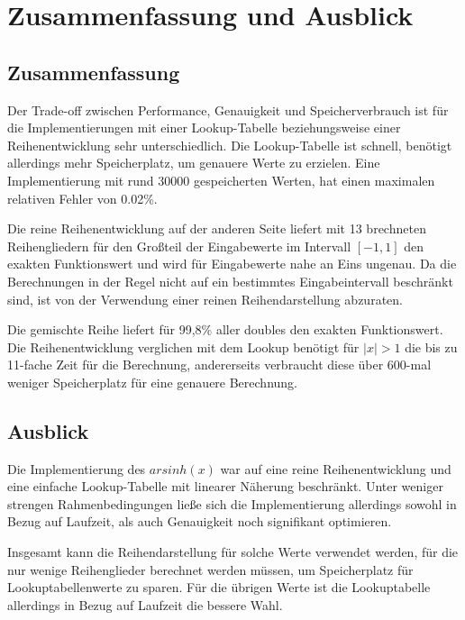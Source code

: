 \documentclass[course=erap] {aspdoc}
\begin{document}
    \section{Zusammenfassung und Ausblick}\label{sec:zusammenfassung-und-ausblick}

    \subsection{Zusammenfassung}\label{subsec:zusammenfassung}

    Der Trade-off zwischen Performance, Genauigkeit und Speicherverbrauch ist für die Implementierungen mit einer Lookup-Tabelle beziehungsweise einer Reihenentwicklung sehr unterschiedlich.
    Die Lookup-Tabelle ist schnell, benötigt allerdings mehr Speicherplatz, um genauere Werte zu erzielen.
    Eine Implementierung mit rund 30000 gespeicherten Werten, hat einen maximalen relativen Fehler von 0.02\%.

    Die reine Reihenentwicklung auf der anderen Seite liefert mit 13 brechneten Reihengliedern für den Großteil der Eingabewerte im Intervall $[-1, 1]$ den exakten Funktionswert und wird für Eingabewerte nahe an Eins ungenau.
    Da die Berechnungen in der Regel nicht auf ein bestimmtes Eingabeintervall beschränkt sind, ist von der Verwendung einer reinen Reihendarstellung abzuraten.
    

    Die gemischte Reihe liefert für 99,8\% aller doubles den exakten Funktionswert.
    Die Reihenentwicklung verglichen mit dem Lookup benötigt für $|x|>1$ die bis zu 11-fache Zeit für die Berechnung, andererseits verbraucht diese über 600-mal weniger Speicherplatz für eine genauere Berechnung.


    \subsection{Ausblick}\label{subsec:ausblick}

    Die Implementierung des $arsinh(x)$ war auf eine reine Reihenentwicklung und eine einfache Lookup-Tabelle mit linearer Näherung beschränkt.
    Unter weniger strengen Rahmenbedingungen ließe sich die Implementierung allerdings sowohl in Bezug auf Laufzeit, als auch Genauigkeit noch signifikant optimieren.

    Insgesamt kann die Reihendarstellung für solche Werte verwendet werden, für die nur wenige Reihenglieder berechnet werden müssen, um Speicherplatz für Lookuptabellenwerte zu sparen. 
    Für die übrigen Werte ist die Lookuptabelle allerdings in Bezug auf Laufzeit die bessere Wahl. 
    
\end{document}
